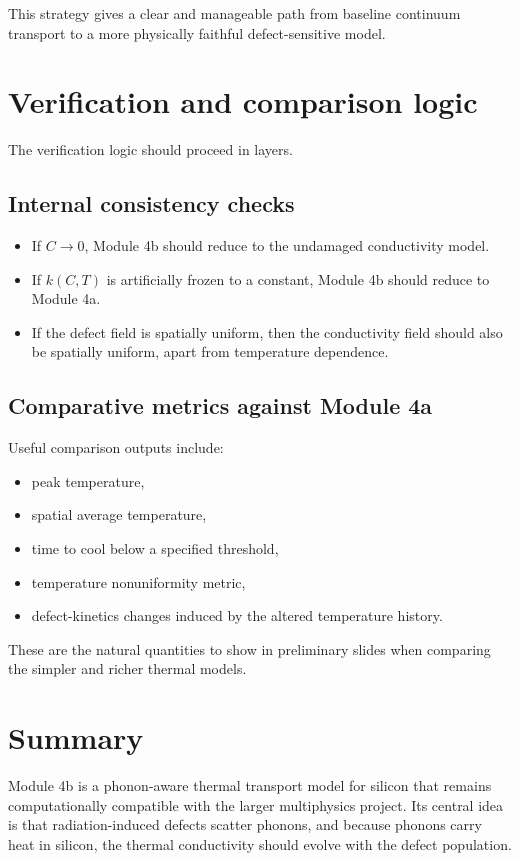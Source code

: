 \documentclass[11pt]{article}
\begin{document}
This strategy gives a clear and manageable path from baseline continuum transport to a more physically faithful defect-sensitive model.

\section{Verification and comparison logic}

The verification logic should proceed in layers.

\subsection{Internal consistency checks}
\begin{itemize}
    \item If $C\to 0$, Module 4b should reduce to the undamaged conductivity model.
    \item If $k(C,T)$ is artificially frozen to a constant, Module 4b should reduce to Module 4a.
    \item If the defect field is spatially uniform, then the conductivity field should also be spatially uniform, apart from temperature dependence.
\end{itemize}

\subsection{Comparative metrics against Module 4a}
Useful comparison outputs include:
\begin{itemize}
    \item peak temperature,
    \item spatial average temperature,
    \item time to cool below a specified threshold,
    \item temperature nonuniformity metric,
    \item defect-kinetics changes induced by the altered temperature history.
\end{itemize}

These are the natural quantities to show in preliminary slides when comparing the simpler and richer thermal models.

\section{Summary}

Module 4b is a phonon-aware thermal transport model for silicon that remains computationally compatible with the larger multiphysics project. Its central idea is that radiation-induced defects scatter phonons, and because phonons carry heat in silicon, the thermal conductivity should evolve with the defect population.
\end{document}
